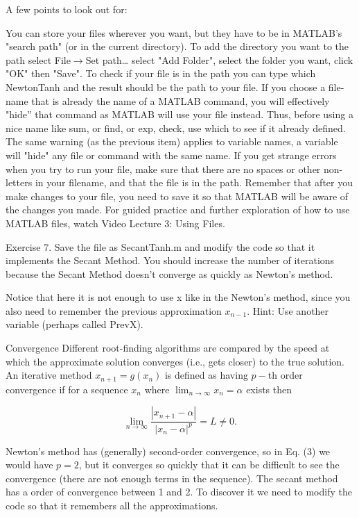 \documentclass[a4paper,12pt]{article}
\begin{document}
A few points to look out for:

You can store your files wherever you want, but they have to be in MATLAB's "search path" (or in the current directory). To add the directory you want to the path select File\(\rightarrow\)Set path… select "Add Folder", select the folder you want, click "OK" then "Save". To check if your file is in the path you can type which NewtonTanh and the result should be the path to your file.
If you choose a file-name that is already the name of a MATLAB command, you will effectively "hide'' that command as MATLAB will use your file instead. Thus, before using a nice name like sum, or find, or exp, check, use which to see if it already defined.
The same warning (as the previous item) applies to variable names, a variable will "hide" any file or command with the same name.
If you get strange errors when you try to run your file, make sure that there are no spaces or other non-letters in your filename, and that the file is in the path.
Remember that after you make changes to your file, you need to save it so that MATLAB will be aware of the changes you made.
For guided practice and further exploration of how to use MATLAB files, watch Video Lecture 3: Using Files.

Exercise 7. Save the file as SecantTanh.m and modify the code so that it implements the Secant Method. You should increase the number of iterations because the Secant Method doesn't converge as quickly as Newton's method.


Notice that here it is not enough to use x like in the Newton's method, since you also need to remember the previous approximation \(x_{n-1}\). Hint: Use another variable (perhaps called PrevX).

Convergence
Different root-finding algorithms are compared by the speed at which the approximate solution converges (i.e., gets closer) to the true solution. An iterative method \(x_{n+1}=g(x_n)\) is defined as having \(p-\)th order convergence if for a sequence \(x_n\) where \(\lim_{n\rightarrow\infty}x_n=\alpha\) exists then

\begin{equation} \label{eq:convergence:order} \lim_{n\rightarrow\infty}\frac{|{x_{n+1}-\alpha}|}{|{x_n-\alpha}|^p} = L \ne 0. \end{equation}

Newton's method has (generally) second-order convergence, so in Eq. (3) we would have \(p=2\), but it converges so quickly that it can be difficult to see the convergence (there are not enough terms in the sequence). The secant method has a order of convergence between 1 and 2. To discover it we need to modify the code so that it remembers all the approximations.
\end{document}

